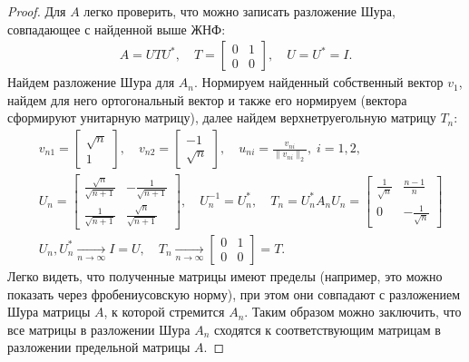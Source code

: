 \documentclass{article}
\newtheorem*{proof}{$\square$}
\begin{document}
\begin{proof}
		Для $A$ легко проверить, что можно записать разложение Шура, совпадающее с найденной выше ЖНФ:
		\begin{equation*}\begin{aligned}
				A = U T U^*,\quad T = \begin{bmatrix}
					0 & 1\\ 0 & 0
				\end{bmatrix},\quad U = U^* = I.
		\end{aligned}\end{equation*}
		Найдем разложение Шура для $A_n$. Нормируем найденный собственный вектор $v_1$, найдем для него ортогональный вектор и также его нормируем (вектора сформируют унитарную матрицу), далее найдем верхнетруегольную матрицу $T_n$:
		\begin{equation*}\begin{aligned}
				&v_{n1} = \begin{bmatrix}
					\sqrt{n}\\ 1
				\end{bmatrix},\quad
				v_{n2} = \begin{bmatrix}
					-1\\ \sqrt{n}
				\end{bmatrix},\quad
				u_{ni} = \frac{v_{ni}}{\|v_{ni}\|_2},\; i=1,2,\\
				&U_n = \begin{bmatrix}
					\frac{\sqrt{n}}{\sqrt{n+1}} & -\frac{1}{\sqrt{n+1}}\\ \frac{1}{\sqrt{n+1}} & \frac{\sqrt{n}}{\sqrt{n+1}}
				\end{bmatrix},\quad U_n^{-1} = U_n^*,\quad
				T_n = U_n^* A_n U_n = \begin{bmatrix}
					\frac{1}{\sqrt{n}} & \frac{n-1}{n}\\ 0 & -\frac{1}{\sqrt{n}}
				\end{bmatrix}\\
				&U_n, U_n^*\xrightarrow[n\to\infty]{} I = U, \quad T_n\xrightarrow[n\to\infty]{} \begin{bmatrix}
					0 & 1\\ 0 & 0
				\end{bmatrix} = T.
		\end{aligned}\end{equation*}
		Легко видеть, что полученные матрицы имеют пределы (например, это можно показать через фробениусовскую норму), при этом они совпадают с разложением Шура матрицы $A$, к которой стремится $A_n$. Таким образом можно заключить, что все матрицы в разложении Шура $A_n$ сходятся к соответствующим матрицам в разложении предельной матрицы $A$. 
	\end{proof}
	
\end{document}

